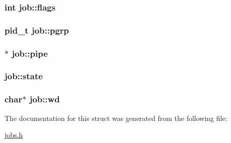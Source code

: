 \subsubsection[{\texorpdfstring{flags}{flags}}]{\setlength{\rightskip}{0pt plus 5cm}int job\+::flags}\hypertarget{structjob_af96c169abb39b4b3f9ccce91cb4b17dc}{}\label{structjob_af96c169abb39b4b3f9ccce91cb4b17dc}
\subsubsection[{\texorpdfstring{pgrp}{pgrp}}]{\setlength{\rightskip}{0pt plus 5cm}pid\+\_\+t job\+::pgrp}\hypertarget{structjob_a36d8fbcede662cb503c447511b10dabc}{}\label{structjob_a36d8fbcede662cb503c447511b10dabc}
\subsubsection[{\texorpdfstring{pipe}{pipe}}]{$\ast$ job\+::pipe}\hypertarget{structjob_a7e5648df5ec2f0d459900325c2cc5816}{}\label{structjob_a7e5648df5ec2f0d459900325c2cc5816}
\subsubsection[{\texorpdfstring{state}{state}}]{ job\+::state}\hypertarget{structjob_a5bee3de4970de999192f8929f926a4fe}{}\label{structjob_a5bee3de4970de999192f8929f926a4fe}
\subsubsection[{\texorpdfstring{wd}{wd}}]{\setlength{\rightskip}{0pt plus 5cm}char$\ast$ job\+::wd}\hypertarget{structjob_ab27dfab9ba607cb3bbdd2b6f2b4e3efc}{}\label{structjob_ab27dfab9ba607cb3bbdd2b6f2b4e3efc}


The documentation for this struct was generated from the following file\+:\begin{DoxyCompactItemize}
\item 
\hyperlink{jobs_8h}{jobs.\+h}\end{DoxyCompactItemize}
